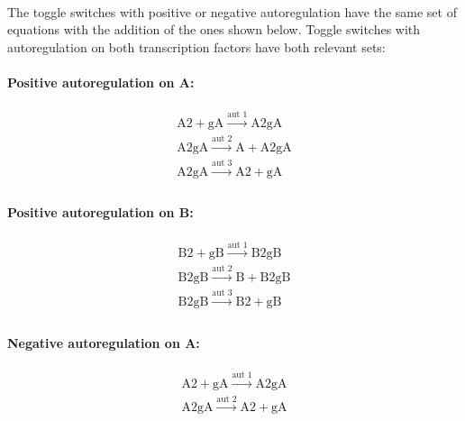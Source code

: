 \paragraph{}

The toggle switches with positive or negative autoregulation have the same set of equations with the addition of the ones shown below. Toggle switches with autoregulation on both transcription factors have both relevant sets:

\paragraph{Positive autoregulation on A:}

$$
\begin{array}{cccc} 
    \textrm{A2} + \textrm{gA} \stackrel{\textrm{aut 1}}{\longrightarrow} \textrm{A2gA} \\
    \textrm{A2gA} \stackrel{\textrm{aut 2}}{\longrightarrow} \textrm{A} + \textrm{A2gA}\\
    \textrm{A2gA} \stackrel{\textrm{aut 3}}{\longrightarrow} \textrm{A2}+ \textrm{gA}  \\
\end{array}
$$
\paragraph{Positive autoregulation on B:}

$$
\begin{array}{cccc} 
    \textrm{B2} + \textrm{gB} \stackrel{\textrm{aut 1}}{\longrightarrow} \textrm{B2gB} \\
    \textrm{B2gB} \stackrel{\textrm{aut 2}}{\longrightarrow} \textrm{B} + \textrm{B2gB}\\
    \textrm{B2gB} \stackrel{\textrm{aut 3}}{\longrightarrow} \textrm{B2}+ \textrm{gB}  \\
\end{array}
$$

\paragraph{Negative autoregulation on A:}

$$
\begin{array}{cccc} 
    \textrm{A2} + \textrm{gA} \stackrel{\textrm{aut 1}}{\longrightarrow} \textrm{A2gA} \\
    \textrm{A2gA} \stackrel{\textrm{aut 2}}{\longrightarrow} \textrm{A2}+ \textrm{gA}  \\
\end{array}
$$
